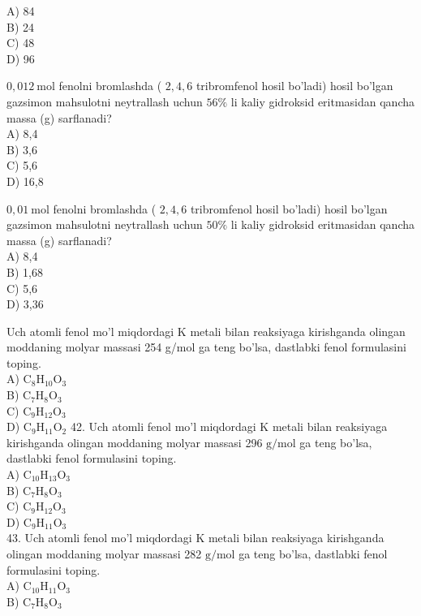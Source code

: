 A) 84\\
B) 24\\
C) 48\\
D) 96
  \item $0,012 \mathrm{~mol}$ fenolni bromlashda ( $2,4,6$ tribromfenol hosil bo'ladi) hosil bo'lgan gazsimon mahsulotni neytrallash uchun $56 \%$ li kaliy gidroksid eritmasidan qancha massa (g) sarflanadi?\\
A) 8,4\\
B) 3,6\\
C) 5,6\\
D) 16,8
  \item $0,01 \mathrm{~mol}$ fenolni bromlashda ( $2,4,6$ tribromfenol hosil bo'ladi) hosil bo'lgan gazsimon mahsulotni neytrallash uchun $50 \%$ li kaliy gidroksid eritmasidan qancha massa (g) sarflanadi?\\
A) 8,4\\
B) 1,68\\
C) 5,6\\
D) 3,36
  \item Uch atomli fenol mo'l miqdordagi K metali bilan reaksiyaga kirishganda olingan moddaning molyar massasi 254 g/mol ga teng bo'lsa, dastlabki fenol formulasini toping.\\
A) $\mathrm{C}_{8} \mathrm{H}_{10} \mathrm{O}_{3}$\\
B) $\mathrm{C}_{7} \mathrm{H}_{8} \mathrm{O}_{3}$\\
C) $\mathrm{C}_{9} \mathrm{H}_{12} \mathrm{O}_{3}$\\
D) $\mathrm{C}_{9} \mathrm{H}_{11} \mathrm{O}_{2}$
42. Uch atomli fenol mo'l miqdordagi K metali bilan reaksiyaga kirishganda olingan moddaning molyar massasi 296 $\mathrm{g} / \mathrm{mol}$ ga teng bo'lsa, dastlabki fenol formulasini toping.\\
A) $\mathrm{C}_{10} \mathrm{H}_{13} \mathrm{O}_{3}$\\
B) $\mathrm{C}_{7} \mathrm{H}_{8} \mathrm{O}_{3}$\\
C) $\mathrm{C}_{9} \mathrm{H}_{12} \mathrm{O}_{3}$\\
D) $\mathrm{C}_{9} \mathrm{H}_{11} \mathrm{O}_{3}$\\
43. Uch atomli fenol mo'l miqdordagi K metali bilan reaksiyaga kirishganda olingan moddaning molyar massasi 282 $\mathrm{g} / \mathrm{mol}$ ga teng bo'lsa, dastlabki fenol formulasini toping.\\
A) $\mathrm{C}_{10} \mathrm{H}_{11} \mathrm{O}_{3}$\\
B) $\mathrm{C}_{7} \mathrm{H}_{8} \mathrm{O}_{3}$\\
